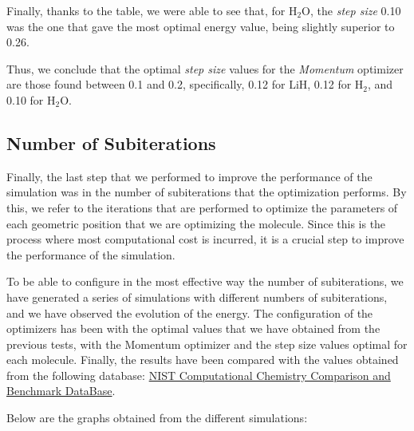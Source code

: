 Finally, thanks to the table, we were able to see that, for \(\mathrm{H_2O}\), the \textit{step size} 0.10 was the one that gave the most optimal energy value, being slightly superior to 0.26.

Thus, we conclude that the optimal \textit{step size} values for the \textit{Momentum} optimizer are those found between 0.1 and 0.2, specifically, 0.12 for \(\mathrm{LiH}\), 0.12 for \(\mathrm{H_2}\), and 0.10 for \(\mathrm{H_2O}\).

\subsection{Number of Subiterations}

Finally, the last step that we performed to improve the performance of the simulation was in the number of subiterations that the optimization performs. By this, we refer to the iterations that are performed to optimize the parameters of each geometric position that we are optimizing the molecule. Since this is the process where most computational cost is incurred, it is a crucial step to improve the performance of the simulation.

To be able to configure in the most effective way the number of subiterations, we have generated a series of simulations with different numbers of subiterations, and we have observed the evolution of the energy. The configuration of the optimizers has been with the optimal values that we have obtained from the previous tests, with the Momentum optimizer and the step size values optimal for each molecule. Finally, the results have been compared with the values obtained from the following database: \href{https://cccbdb.nist.gov/}{NIST Computational Chemistry Comparison and Benchmark DataBase}.

Below are the graphs obtained from the different simulations:

